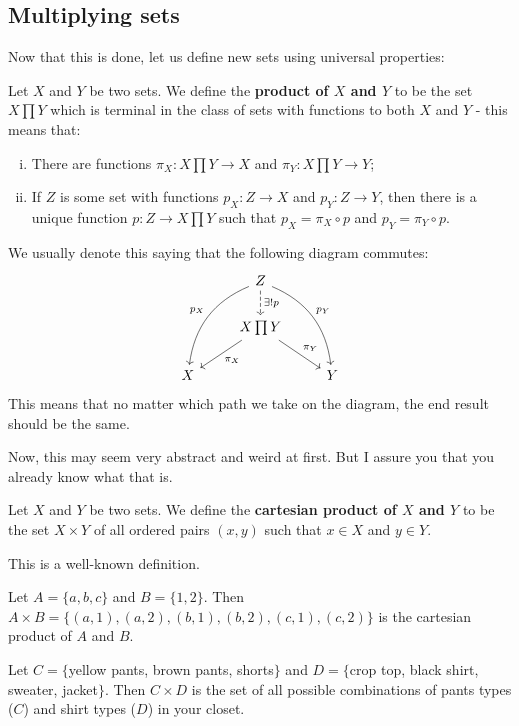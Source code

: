 \newpage
\subsection{Multiplying sets}
Now that this is done, let us define new sets using universal properties:

\begin{df}
	Let $X$ and $Y$ be two sets. We define the \textbf{product of $X$ and $Y$} to be the set $X\prod Y$ which is terminal in the class of sets with functions to both $X$ and $Y$ - this means that:
	\begin{enumerate}[i.]
		\item There are functions $\pi_X:X\prod Y\to X$ and $\pi_Y:X\prod Y\to Y$;
		\item If $Z$ is some set with functions $p_X:Z\to X$ and $p_Y:Z\to Y$, then there is a unique function $p:Z\to X\prod Y$ such that $p_X=\pi_X\circ p$ and $p_Y=\pi_Y\circ p$.
	\end{enumerate}
\end{df}

We usually denote this saying that the following diagram commutes:
\[\begin{tikzcd}
& Z \arrow[ldd, "p_X"', bend right] \arrow[rdd, "p_Y", bend left] \arrow[d, "\exists!p", dashed] &   \\
& X\prod Y \arrow[ld, "\pi_X"] \arrow[rd, "\pi_Y"]                                               &   \\
X &                                                                                                & Y
\end{tikzcd}\]
This means that no matter which path we take on the diagram, the end result should be the same.

Now, this may seem very abstract and weird at first. But I assure you that you already know what that is.

\begin{df}
	Let $X$ and $Y$ be two sets. We define the \textbf{cartesian product of $X$ and $Y$} to be the set $X\times Y$ of all ordered pairs $(x,y)$ such that $x\in X$ and $y\in Y$.
\end{df}

This is a well-known definition.

\begin{ex}
	Let $A=\{a,b,c\}$ and $B=\{1,2\}$. Then $A\times B=\{(a,1),(a,2),(b,1),(b,2),(c,1),(c,2)\}$ is the cartesian product of $A$ and $B$.
	
	Let $C=\{$yellow pants, brown pants, shorts$\}$ and $D=\{$crop top, black shirt, sweater, jacket$\}$. Then $C\times D$ is the set of all possible combinations of pants types ($C$) and shirt types ($D$) in your closet.
\end{ex}

